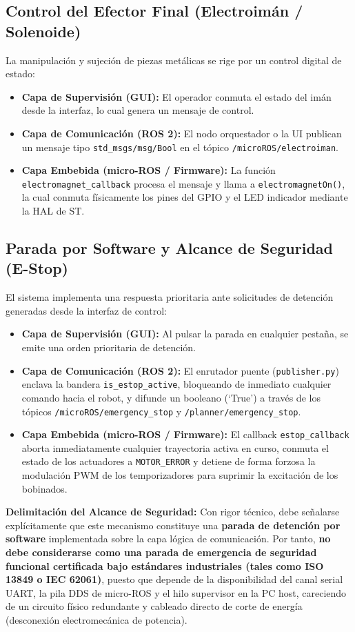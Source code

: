 \documentclass[12pt, a4paper]{report}
\begin{document}
\subsection{Control del Efector Final (Electroimán / Solenoide)}
La manipulación y sujeción de piezas metálicas se rige por un control digital de estado:
\begin{itemize}
    \item \textbf{Capa de Supervisión (GUI):} El operador conmuta el estado del imán desde la interfaz, lo cual genera un mensaje de control.
    \item \textbf{Capa de Comunicación (ROS 2):} El nodo orquestador o la UI publican un mensaje tipo \texttt{std\_msgs/msg/Bool} en el tópico \texttt{/microROS/electroiman}.
    \item \textbf{Capa Embebida (micro-ROS / Firmware):} La función \texttt{electromagnet\_callback} procesa el mensaje y llama a \texttt{electromagnetOn()}, la cual conmuta físicamente los pines del GPIO y el LED indicador mediante la HAL de ST.
\end{itemize}

\subsection{Parada por Software y Alcance de Seguridad (E-Stop)}
El sistema implementa una respuesta prioritaria ante solicitudes de detención generadas desde la interfaz de control:
\begin{itemize}
    \item \textbf{Capa de Supervisión (GUI):} Al pulsar la parada en cualquier pestaña, se emite una orden prioritaria de detención.
    \item \textbf{Capa de Comunicación (ROS 2):} El enrutador puente (\texttt{publisher.py}) enclava la bandera \texttt{is\_estop\_active}, bloqueando de inmediato cualquier comando hacia el robot, y difunde un booleano (`True') a través de los tópicos \texttt{/microROS/emergency\_stop} y \texttt{/planner/emergency\_stop}.
    \item \textbf{Capa Embebida (micro-ROS / Firmware):} El callback \texttt{estop\_callback} aborta inmediatamente cualquier trayectoria activa en curso, conmuta el estado de los actuadores a \texttt{MOTOR\_ERROR} y detiene de forma forzosa la modulación PWM de los temporizadores para suprimir la excitación de los bobinados.
\end{itemize}

\textbf{Delimitación del Alcance de Seguridad:} Con rigor técnico, debe señalarse explícitamente que este mecanismo constituye una \textbf{parada de detención por software} implementada sobre la capa lógica de comunicación. Por tanto, \textbf{no debe considerarse como una parada de emergencia de seguridad funcional certificada bajo estándares industriales (tales como ISO 13849 o IEC 62061)}, puesto que depende de la disponibilidad del canal serial UART, la pila DDS de micro-ROS y el hilo supervisor en la PC host, careciendo de un circuito físico redundante y cableado directo de corte de energía (desconexión electromecánica de potencia).
\end{document}
